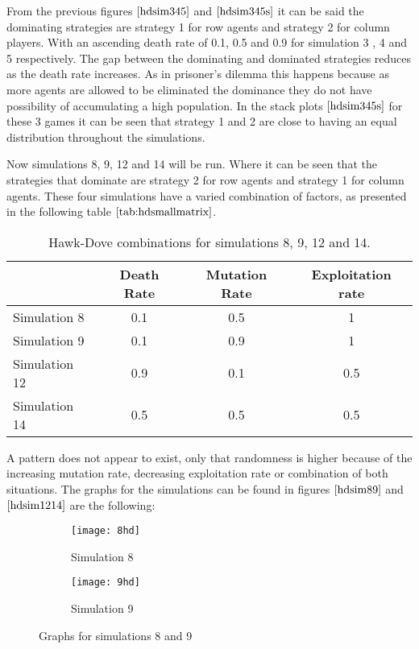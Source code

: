 From the previous figures $\ref{hdsim345}$ and $\ref{hdsim345s}$  it can be said the dominating strategies are strategy 1 for row agents and strategy 2 for column players. With an ascending death rate of 0.1, 0.5 and 0.9 for simulation 3 , 4 and 5 respectively. The gap between the dominating and dominated strategies reduces as the death rate increases. As in prisoner's dilemma this happens because as more agents are allowed to be eliminated the dominance they do not have possibility of accumulating a high population. In the stack plots $\ref{hdsim345s}$ for these 3 games it can be seen that strategy 1 and 2 are close to having an equal distribution throughout the simulations. 


Now simulations 8, 9, 12 and 14 will be run. Where it can be seen that the strategies that dominate are strategy 2 for row agents and strategy 1 for column agents. These four simulations have a varied combination of factors, as presented in the following table $\ref{tab:hdsmallmatrix}$.

\begin{table}[H]
\begin{center}

\begin{tabular}{|l|c|c|c|}
\hline
 & Death Rate & Mutation Rate & Exploitation rate\\ 
\hline
Simulation 8 & 0.1 & 0.5 & 1\\
\hline
Simulation 9 &  0.1 & 0.9 & 1\\
\hline
Simulation 12 & 0.9 & 0.1 & 0.5\\
\hline
Simulation 14 & 0.5 & 0.5 & 0.5\\
\hline
\end{tabular}
\caption{ Hawk-Dove combinations for simulations 8, 9, 12 and 14.}
\label{tab:hdsmallmatrix}	
\end{center}
\end{table}
A pattern does not appear to exist, only that randomness is higher because of the increasing mutation rate, decreasing exploitation rate or combination of both situations. The graphs for the simulations can be found in figures $\ref{hdsim89}$ and $\ref{hdsim1214}$ are the following:


\begin{figure}[H]       
    \centering
    \begin{subfigure}[b]{0.3\textwidth}
	\centering
	{\texttt{[image: 8hd]}}   
    	\caption{Simulation 8}
	\label{fig:hd8}
    \end{subfigure}
    \hfill
    \begin{subfigure}[b]{0.3\textwidth}
	\centering
	{\texttt{[image: 9hd]}}   
    	\caption{Simulation 9}
	\label{fig:hd9}
    \end{subfigure}
   \caption{Graphs for simulations 8 and 9}
    \label{hdsim89}
\end{figure}

